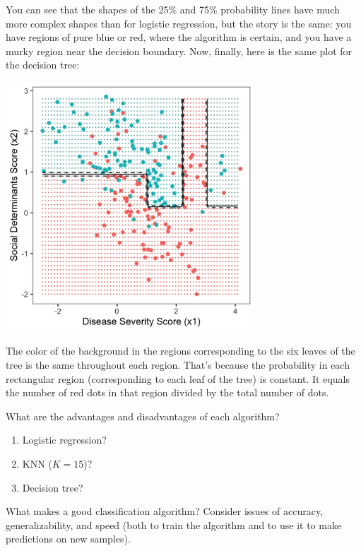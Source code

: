 You can see that the shapes of the 25\% and 75\% probability lines have much more complex shapes than for logistic regression, but the story is the same: you have regions of pure blue or red, where the algorithm is certain, and you have a murky region near the decision boundary. Now, finally, here is the same plot for the decision tree:
\begin{center}
\includegraphics[width=0.7\textwidth]{img/esl-decision-tree-prob.png}
\end{center}
The color of the background in the regions corresponding to the six leaves of the tree is the same throughout each region. That's because the probability in each rectangular region (corresponding to each leaf of the tree) is constant. It equals the number of red dots in that region divided by the total number of dots. 

\begin{question}{}
What are the advantages and disadvantages of each algorithm?
  \begin{enumerate}
  \item Logistic regression?
  \item KNN ($K=15$)?
  \item Decision tree?
  \end{enumerate}
\end{question}

\begin{question}{}
What makes a good classification algorithm? Consider issues of accuracy, generalizability, and speed (both to train the algorithm and to use it to make predictions on new samples). 
\end{question}

